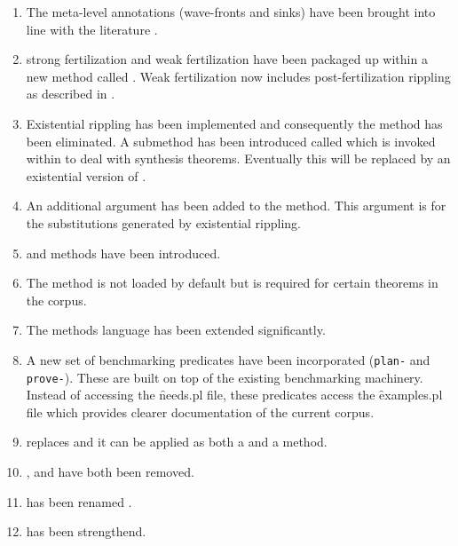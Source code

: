 \begin{enumerate}
\item The meta-level annotations (wave-fronts and sinks)
have been brought into line with the literature \cite{pub567}.

\item strong fertilization and weak fertilization
have been packaged up within a new method called
. Weak fertilization now includes post-fertilization
rippling as described in \cite{pub567}.

\item Existential rippling \cite{pub567} has been implemented and
consequently the  method has been eliminated.
A submethod has been introduced called  which
is invoked within  to deal with synthesis
theorems. Eventually this will be replaced by an existential
version of .

\item An additional argument has been added to the 
method. This argument is for the substitutions generated by
existential rippling.

\item {} and  methods have been
introduced.

\item The  method is not loaded by default but is
required for certain theorems in the corpus.

\item The methods language has been extended significantly.

\item A new set of benchmarking predicates have been incorporated
({\tt plan-} and {\tt prove-}). These are built on top of the existing
benchmarking machinery. Instead of accessing the \f{needs.pl} file,
these predicates access the \f{examples.pl} file which 
provides clearer documentation of the current corpus.

\item {} replaces  and it can be applied
as both a  and a  method.

\item {}, and  have both been 
removed.

\item {} has been renamed . 

\item {} has been strengthend.


\end{enumerate}
